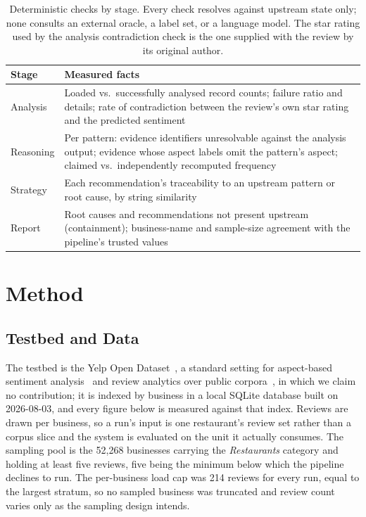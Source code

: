 \documentclass[runningheads]{llncs}
\begin{document}
\begin{table}[t]
\caption{Deterministic checks by stage. Every check resolves against upstream
state only; none consults an external oracle, a label set, or a language model.
The star rating used by the analysis contradiction check is the one supplied with
the review by its original author.}
\label{tab:checks}
\centering
\begin{tabular}{lp{7.6cm}}
\toprule
Stage & Measured facts \\
\midrule
Analysis  & Loaded vs.\ successfully analysed record counts; failure ratio and
            details; rate of contradiction between the review's own star rating
            and the predicted sentiment \\
Reasoning & Per pattern: evidence identifiers unresolvable against the analysis
            output; evidence whose aspect labels omit the pattern's aspect;
            claimed vs.\ independently recomputed frequency \\
Strategy  & Each recommendation's traceability to an upstream pattern or root
            cause, by string similarity \\
Report    & Root causes and recommendations not present upstream (containment);
            business-name and sample-size agreement with the pipeline's trusted
            values \\
\bottomrule
\end{tabular}
\end{table}



\section{Method}
\label{sec:method}

\subsection{Testbed and Data}

The testbed is the Yelp Open Dataset~\cite{yelpdataset}, a standard setting for
aspect-based sentiment
analysis~\cite{semeval2014,simmering2023,wu2024absa,niimi2024} and review
analytics over public corpora~\cite{malik2024}, in which we claim no
contribution; it is indexed by business in a local SQLite database built on
2026-08-03, and every figure below is measured against that index. Reviews are
drawn per business, so a run's input is one restaurant's review set rather than a
corpus slice and the system is evaluated on the unit it actually consumes. The
sampling pool is the 52{,}268 businesses carrying the \emph{Restaurants} category
and holding at least five reviews, five being the minimum below which the pipeline
declines to run. The per-business load cap was 214 reviews for every run, equal to
the largest stratum, so no sampled business was truncated and review count varies
only as the sampling design intends.
\end{document}
